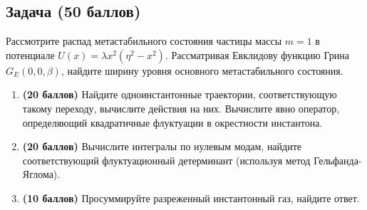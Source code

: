 \documentclass[12pt]{article}
\theoremstyle{definition}
\begin{document}
\subsection*{Задача (50 баллов)}
Рассмотрите распад метастабильного состояния частицы массы $m = 1$ в потенциале $U(x) = \lambda x^2(\eta^2-x^2)$. Рассматривая Евклидову функцию Грина $G_E(0, 0, \beta)$, найдите ширину уровня основного метастабильного состояния.
\begin{enumerate}
    \item \textbf{(20 баллов)} Найдите одноинстантонные траектории, соответствующую такому переходу, вычислите действия на них. Вычислите явно оператор, определяющий квадратичные флуктуации в окрестности инстантона.
    \item \textbf{(20 баллов)} Вычислите интегралы по нулевым модам, найдите соответствующий флуктуационный детерминант (используя метод Гельфанда-Яглома).
    \item \textbf{(10 баллов)} Просуммируйте разреженный инстантонный газ, найдите ответ.
\end{enumerate}
\end{document}

